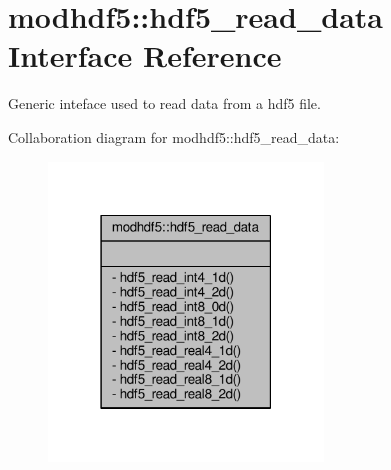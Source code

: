 \hypertarget{interfacemodhdf5_1_1hdf5__read__data}{}\section{modhdf5\+:\+:hdf5\+\_\+read\+\_\+data Interface Reference}
\label{interfacemodhdf5_1_1hdf5__read__data}


Generic inteface used to read data from a hdf5 file.  




Collaboration diagram for modhdf5\+:\+:hdf5\+\_\+read\+\_\+data\+:\nopagebreak
\begin{figure}[H]
\begin{center}
\leavevmode
\includegraphics[width=207pt]{interfacemodhdf5_1_1hdf5__read__data__coll__graph}
\end{center}
\end{figure}
